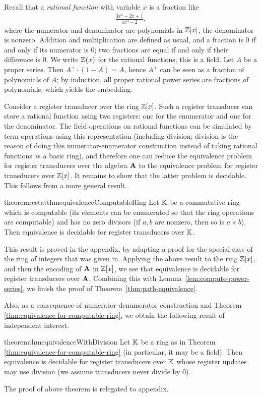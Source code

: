 Recall that a \emph{rational function} with variable $x$ is a fraction like 
\begin{align*}
\frac{3x^2 -2x +1}{4x^3 -2},
\end{align*}
where  the numerator and denominator are polynomials in $\mathbb Z[x]$, the denominator is nonzero. Addition and multiplication are defined as usual, and a fraction is 0 if and only if its numerator is 0; two fractions are equal if and only if their difference is 0. We write $\mathbb Z(x)$ for the rational functions; this is a field. Let $A$ be a proper series. Then $A^+ \cdot (1-A) = A$, hence $A^+$ can be seen as a fraction of polynomials of $A$; by induction, all proper rational power series  are fractions of polynomials, which yields the embedding. 

Consider a register transducer over the ring $\mathbb Z[x]$. Such a register transducer can store a rational function using two registers: one for the enumerator and one for the denominator. The field operations on rational functions can be simulated by term operations using this representation (including division; division is the reason of doing this numerator-enumerator construction instead of taking rational functions as a basic ring), and therefore one can reduce the equivalence problem for register transducers over the algebra $\mathbf{A}$ to the equivalence problem for register transducers over $\mathbb Z[x]$. It remains to show that the latter problem is decidable. This follows from a more general result.

\begin{restatable}{theoremrestat}{thmequivalenceComputableRing}\label{thm:equivalence-for-computable-ring}
    Let ${\mathbb K}$ be a commutative ring which is computable (its elements can be enumerated so that the ring operations are computable) and has no zero divisors (if $a,b$ are nonzero, then so is $a \times b$). Then equivalence is decidable for register transducers over ${\mathbb K}$.
\end{restatable}
This result is proved in the appendix, by adapting a proof for the special case of the ring of integers that was given in\cite[Theorem 6.6]{seidlManethKemper2018}. 
Applying the above result to the ring $\mathbb Z[x]$, and then the encoding of $\mathbf{A}$ in $\mathbb Z[x]$, we see that equivalence is decidable for register transducers over $\mathbf{A}$. Combining this with Lemma~\ref{lem:compute-power-series}, we finish the proof of Theorem~\ref{thm:path-equivalence}.

Also, as a consequence of numerator-denumerator construction and Theorem \ref{thm:equivalence-for-computable-ring}, we obtain the following result of independent interest.
\begin{restatable}{theorem}{thmequivalenceWithDivision}\label{thm:equivalence-with-division}
    Let ${\mathbb K}$ be a ring as in Theorem \ref{thm:equivalence-for-computable-ring} (in particular, it may be a field). Then equivalence is decidable for register transducers over ${\mathbb K}$ whose register updates may use division (we assume transducers never divide by 0).
\end{restatable}
The proof of above theorem is relegated to appendix.